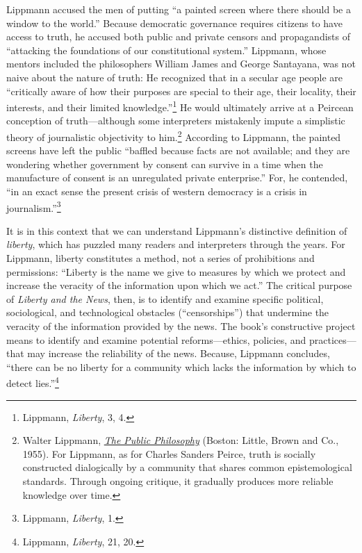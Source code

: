 \documentclass[openany,nobib,nohyper]{tufte-book}
\begin{document}
Lippmann accused the men of putting ``a painted screen where there
should be a window to the world.'' Because democratic governance
requires citizens to have access to truth, he accused both public and
private censors and propagandists of ``attacking the foundations of our
constitutional system.'' Lippmann, whose mentors included the
philosophers William James and George Santayana, was not naive about the
nature of truth: He recognized that in a secular age people are
``critically aware of how their purposes are special to their age, their
locality, their interests, and their limited
knowledge.''\footnote{Lippmann, \emph{Liberty}, 3, 4.} He would ultimately
arrive at a Peircean conception of truth---although some interpreters
mistakenly impute a simplistic theory of journalistic objectivity to
him.\footnote{Walter Lippmann,
  \emph{\href{http://www.worldcat.org/oclc/976578926}{The Public
  Philosophy}} (Boston: Little, Brown and Co., 1955). For Lippmann, as
  for Charles Sanders Peirce, truth is socially constructed dialogically
  by a community that shares common epistemological standards. Through
  ongoing critique, it gradually produces more reliable knowledge over
  time.} According to Lippmann, the
painted screens have left the public ``baffled because facts are not
available; and they are wondering whether government by consent can
survive in a time when the manufacture of consent is an unregulated
private enterprise.'' For, he contended, ``in an exact sense the present
crisis of western democracy is a crisis in
journalism.''\footnote{Lippmann, \emph{Liberty}, 1.}

It is in this context that we can understand Lippmann's distinctive
definition of \emph{liberty}, which has puzzled many readers and
interpreters through the years. For Lippmann, liberty constitutes a
method, not a series of prohibitions and permissions: ``Liberty is the
name we give to measures by which we protect and increase the veracity
of the information upon which we act.'' The critical purpose of
\emph{Liberty and the News}, then, is to identify and examine specific
political, sociological, and technological obstacles (``censorships'')
that undermine the veracity of the information provided by the news. The
book's constructive project means to identify and examine potential
reforms---ethics, policies, and practices---that may increase the
reliability of the news. Because, Lippmann concludes, ``there can be no
liberty for a community which lacks the information by which to detect
lies.''\footnote{Lippmann, \emph{Liberty}, 21, 20.}
\end{document}
